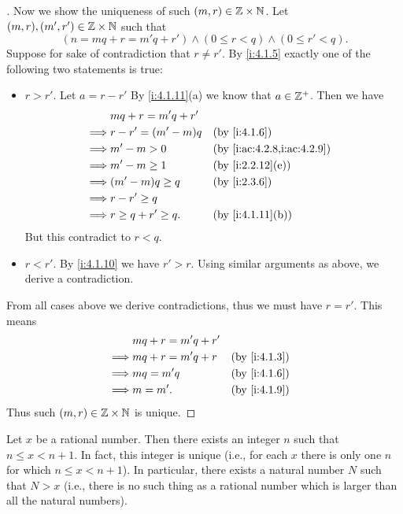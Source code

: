 \begin{proof}[]
  Now we show the uniqueness of such \((m, r) \in \mathbb{Z} \times \mathbb{N}\).
  Let \((m, r), (m', r') \in \mathbb{Z} \times \mathbb{N}\) such that
  \[
    (n = mq + r = m'q + r') \land (0 \leq r < q) \land (0 \leq r' < q).
  \]
  Suppose for sake of contradiction that \(r \neq r'\).
  By \cref{i:4.1.5} exactly one of the following two statements is true:
  \begin{itemize}
    \item \(r > r'\).
          Let \(a = r - r'\)
          By \cref{i:4.1.11}(a) we know that \(a \in \mathbb{Z}^+\).
          Then we have
          \begin{align*}
                     & mq + r = m'q + r'                                     \\
            \implies & r - r' = (m' - m)q    &  & \by{i:4.1.6}               \\
            \implies & m' - m > 0            &  & \by{i:ac:4.2.8,i:ac:4.2.9} \\
            \implies & m' - m \geq 1         &  & \by{i:2.2.12}[e]           \\
            \implies & (m' - m)q \geq q      &  & \by{i:2.3.6}               \\
            \implies & r - r' \geq q                                         \\
            \implies & r \geq q + r' \geq q. &  & \by{i:4.1.11}[b]
          \end{align*}
          But this contradict to \(r < q\).
    \item \(r < r'\).
          By \cref{i:4.1.10} we have \(r' > r\).
          Using similar arguments as above, we derive a contradiction.
  \end{itemize}
  From all cases above we derive contradictions, thus we must have \(r = r'\).
  This means
  \begin{align*}
             & mq + r = m'q + r'                   \\
    \implies & mq + r = m'q + r  &  & \by{i:4.1.3} \\
    \implies & mq = m'q          &  & \by{i:4.1.6} \\
    \implies & m = m'.           &  & \by{i:4.1.9}
  \end{align*}
  Thus such \((m, r) \in \mathbb{Z} \times \mathbb{N}\) is unique.
\end{proof}

\begin{prop}\label{i:4.4.1}
  Let \(x\) be a rational number.
  Then there exists an integer \(n\) such that \(n \leq x < n + 1\).
  In fact, this integer is unique (i.e., for each \(x\) there is only one \(n\) for which \(n \leq x < n + 1\)).
  In particular, there exists a natural number \(N\) such that \(N > x\)
  (i.e., there is no such thing as a rational number which is larger than all the natural numbers).
\end{prop}

